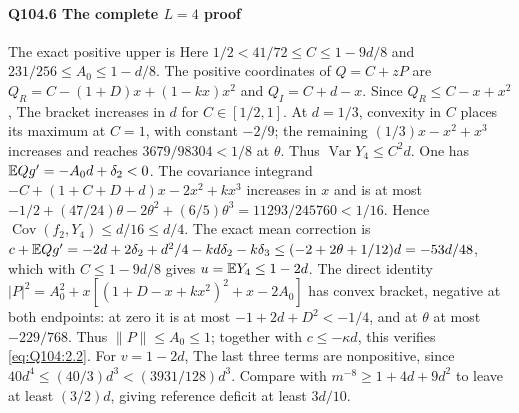 \paragraph{Q104.6 The complete $L=\allowbreak 4$ proof}\label{part:Q104.6}
The exact positive upper is
Here $1/2<\allowbreak 41/72\le\allowbreak  C\le\allowbreak 1-9d/8$ and $231/256\le\allowbreak  A_0\le\allowbreak 1-d/8$.
The positive coordinates of $Q=\allowbreak C+zP$ are
$Q_R=\allowbreak C-(1+D)x+(1-kx)x^2$ and $Q_I=\allowbreak C+d-x$.
Since $Q_R\le\allowbreak  C-x+x^2$,
The bracket increases in $d$ for $C\in[1/2,\allowbreak 1]$.
At $d=\allowbreak 1/3$, convexity in $C$ places its maximum at $C=\allowbreak 1$, with
constant $-2/9$; the remaining $(1/3)x-x^2+x^3$ increases and reaches
$3679/98304<\allowbreak 1/8$ at $\theta$.
Thus $\operatorname{Var}Y_4\le\allowbreak  C^2d$.
One has $\mathbb E Qg'=\allowbreak -A_0d+\delta_2<\allowbreak 0$.
The covariance integrand
$-C+(1+C+D+d)x-2x^2+kx^3$ increases in $x$ and is at most
$-1/2+(47/24)\theta-2\theta^2+(6/5)\theta^3
=11293/245760<1/16$.
Hence $\operatorname{Cov}(f_2,\allowbreak Y_4)\le\allowbreak  d/16\le\allowbreak  d/4$.
The exact mean correction is
$c+\mathbb E Qg'=-2d+2\delta_2+d^2/4-kd\delta_2-k\delta_3
\le(-2+2\theta+1/12)d=-53d/48$,
which with $C\le\allowbreak 1-9d/8$ gives $u=\allowbreak \mathbb E Y_4\le\allowbreak 1-2d$.
The direct identity
$|P|^2=\allowbreak A_0^2+x[(1+D-x+kx^2)^2+x-2A_0]$
has convex bracket, negative at both endpoints: at zero it is at most
$-1+2d+D^2<\allowbreak -1/4$, and at $\theta$ at most $-229/768$.
Thus $\|P\|\le\allowbreak  A_0\le\allowbreak 1$; together with $c\le\allowbreak -\kappa d$, this verifies
\eqref{eq:Q104:2.2}.
For $v=\allowbreak 1-2d$,
The last three terms are nonpositive, since
$40d^4\le\allowbreak (40/3)d^3<\allowbreak (3931/128)d^3$.
Compare with $m^{-8}\ge\allowbreak 1+4d+9d^2$ to leave at least $(3/2)d$,
giving reference deficit at least $3d/10$.

